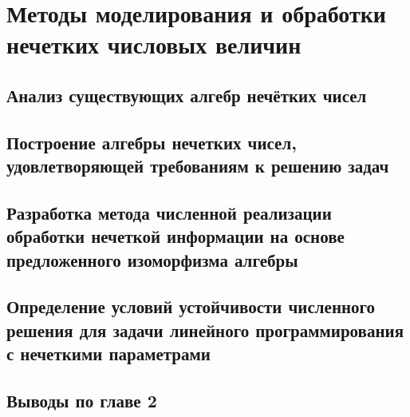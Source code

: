 \chapter{Методы моделирования и обработки нечетких числовых величин}
\label{chapter2}

\section{Анализ существующих алгебр нечётких чисел}
\label{chapter2_1}


\section{Построение алгебры нечетких чисел, удовлетворяющей требованиям к решению задач}
\label{chapter2_2}


\section{Разработка метода численной реализации обработки нечеткой информации на основе предложенного изоморфизма алгебры} 
\label{chapter2_3}


\section{Определение условий устойчивости численного решения для задачи линейного программирования с нечеткими параметрами} 
\label{chapter2_4}


\section{Выводы по главе 2} 
\label{chapter2_5}
